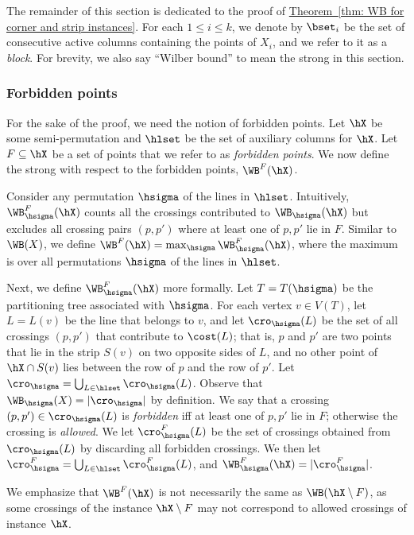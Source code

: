 \documentclass[11pt]{article}
\numberwithin{equation}{section}
\theoremstyle{definition}
\theoremstyle{plain}
\newcommand{\expref}[2]{\hyperref[#2]{#1~\ref{#2}}}
\begin{document}
The remainder of this section is dedicated to the proof of \expref{Theorem}{thm: WB for corner and strip instances}.
%
For each $1\leq i\leq k$, we denote by $\bset_i$ be the set of consecutive active columns containing the points of $X_i$, and we refer to it as a \emph{block}. For brevity, we also say ``Wilber bound'' to mean the strong \WBone in this section.

%
%
%
%
\subsubsection{Forbidden points}
%
%
%
%
For the sake of the proof, we need the notion of forbidden points.
Let $\hX$ be some semi-permutation and $\hlset$ be the set of auxiliary columns for $\hX$.
Let $F\subseteq \hX$ be a set of points that we refer to as \emph{forbidden points}.
We now define the strong \WBone with respect to the forbidden points, $\WB^F(\hX)$.

Consider any permutation $\hsigma$ of the lines in $\hlset$. 
Intuitively, $\WB_{\hsigma}^F(\hX)$ counts all the crossings contributed to $\WB_{\hsigma}(\hX)$ but excludes all crossing pairs $(p,p')$ where at least one of $p,p'$ lie in $F$.
Similar to $\WB(X)$, we define $\WB^F(\hX) = \max_{\hsigma} \WB_{\hsigma}^F(\hX)$, where the maximum is over all permutations $\hsigma$ of the lines in $\hlset$.

Next, we define $\WB_{\hsigma}^F(\hX)$ more formally. 
Let $T=T(\hsigma)$ be the partitioning tree associated with $\hsigma$.
For each vertex $v \in V(T)$, let $L = L(v)$ be the line that belongs to $v$, and 
let $\cro_{\hsigma}(L)$ be the set of all crossings $(p,p')$ that contribute to $\cost(L)$; 
that is, $p$ and $p'$ are two points that lie in the strip $S(v)$ on two opposite sides of $L$, and no other point of $\hX\cap S(v)$ lies between the row of $p$ and the row of $p'$.
Let $\cro_{\hsigma} = \bigcup_{L\in \hlset}\cro_{\hsigma}(L)$.
Observe that $\WB_{\hsigma}(X) = |\cro_{\hsigma}|$ by definition.
We say that a crossing $(p,p')\in \cro_{\hsigma}(L)$ is \emph{forbidden} iff at least one of $p,p'$ lie in $F$; otherwise the crossing is \emph{allowed}. We let $\cro^F_{\hsigma}(L)$ be the set of crossings obtained from $\cro_{\hsigma}(L)$ by discarding all forbidden crossings. We then let $\cro^F_{\hsigma}=\bigcup_{L\in \hlset}\cro^F_{\hsigma}(L)$, and $\WB^F_{\hsigma}(\hX)=|\cro^F_{\hsigma}|$.
%
%
%
%

We emphasize that $\WB^F(\hX)$ is not necessarily the same as $\WB(\hX\setminus F)$, as some crossings of the instance $\hX\setminus F$ may not correspond to allowed crossings of instance $\hX$.
\end{document}
